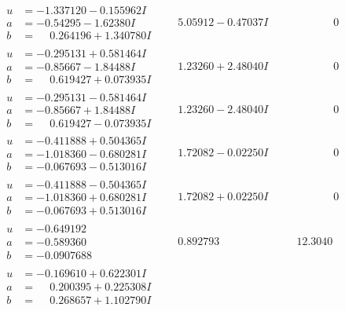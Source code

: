 \documentclass[1p]{elsarticle_modified}
\theoremstyle{definition}
\begin{document}
$$\begin{array}{c|c|c}
\begin{aligned}
u &= -1.337120 - 0.155962 I \\
a &= -0.54295 - 1.62380 I \\
b &= \phantom{-}0.264196 + 1.340780 I\end{aligned}
 & \phantom{-}5.05912 - 0.47037 I & \phantom{-0.000000 } 0 \\ \hline\begin{aligned}
u &= -0.295131 + 0.581464 I \\
a &= -0.85667 - 1.84488 I \\
b &= \phantom{-}0.619427 + 0.073935 I\end{aligned}
 & \phantom{-}1.23260 + 2.48040 I & \phantom{-0.000000 } 0 \\ \hline\begin{aligned}
u &= -0.295131 - 0.581464 I \\
a &= -0.85667 + 1.84488 I \\
b &= \phantom{-}0.619427 - 0.073935 I\end{aligned}
 & \phantom{-}1.23260 - 2.48040 I & \phantom{-0.000000 } 0 \\ \hline\begin{aligned}
u &= -0.411888 + 0.504365 I \\
a &= -1.018360 - 0.680281 I \\
b &= -0.067693 - 0.513016 I\end{aligned}
 & \phantom{-}1.72082 - 0.02250 I & \phantom{-0.000000 } 0 \\ \hline\begin{aligned}
u &= -0.411888 - 0.504365 I \\
a &= -1.018360 + 0.680281 I \\
b &= -0.067693 + 0.513016 I\end{aligned}
 & \phantom{-}1.72082 + 0.02250 I & \phantom{-0.000000 } 0 \\ \hline\begin{aligned}
u &= -0.649192\phantom{ +0.000000I} \\
a &= -0.589360\phantom{ +0.000000I} \\
b &= -0.0907688\phantom{ +0.000000I}\end{aligned}
 & \phantom{-}0.892793\phantom{ +0.000000I} & \phantom{-}12.3040\phantom{ +0.000000I} \\ \hline\begin{aligned}
u &= -0.169610 + 0.622301 I \\
a &= \phantom{-}0.200395 + 0.225308 I \\
b &= \phantom{-}0.268657 + 1.102790 I\end{aligned}

\end{array}$$
\end{document}
